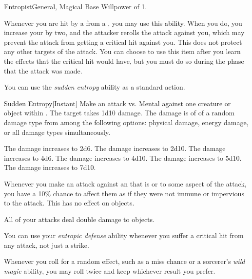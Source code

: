    \begin{feat}{Entropist}{General, Magical}
        \featpre Base Willpower of 1.

         Whenever you are hit by a  from a , you may use this ability.
        When you do, you increase your  by two, and the attacker rerolls the attack against you, which may prevent the attack from getting a critical hit against you.
        This does not protect any other targets of the attack.
        You can choose to use this item after you learn the effects that the critical hit would have, but you must do so during the phase that the attack was made.

         You can use the \textit{sudden entropy} ability as a standard action.
        \begin{instantability}{Sudden Entropy}[Instant]
            \rankline
            Make an attack vs. Mental against one creature or object within \medrange.
            \hit The target takes 1d10 \add {} damage.
            The damage is of of a random damage type from among the following options: physical damage, energy damage, or all damage types simultaneously.

            \rankline
             The damage increases to 2d6.
             The damage increases to 2d10.
             The damage increases to 4d6.
             The damage increases to 4d10.
             The damage increases to 5d10.
             The damage increases to 7d10.
        \end{instantability}

         Whenever you make an attack against an  that is  or  to some aspect of the attack, you have a 10\% chance to affect them as if they were not immune or impervious to the attack.
        This has no effect on objects.

         All of your attacks deal double damage to objects.

         You can use your \textit{entropic defense} ability whenever you suffer a critical hit from any attack, not just a strike.

         Whenever you roll for a random effect, such as a miss chance or a sorcerer's \textit{wild magic} ability, you may roll twice and keep whichever result you prefer.


\end{feat}
